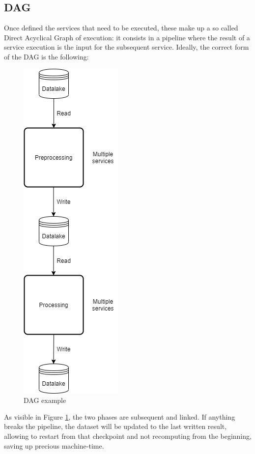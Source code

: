 \documentclass[\main/main.tex]{subfiles}
\begin{document}
\subsection{DAG}
Once defined the services that need to be executed, these make up a so called Direct Acyclical Graph of execution: it consists in a pipeline where the result of a service execution is the input for the subsequent service. Ideally, the correct form of the DAG is the following:
\begin{figure}[h]
    \centering
    \includegraphics[scale=0.5]{images/architecture/dag_theory.png}
    \caption{DAG example}
    \label{fig:dag_example}
\end{figure}
As visible in Figure \ref{fig:dag_example}, the two phases are subsequent and linked. If anything breaks the pipeline, the dataset will be updated to the last written result, allowing to restart from that checkpoint and not recomputing from the beginning, saving up precious machine-time.
\end{document}
